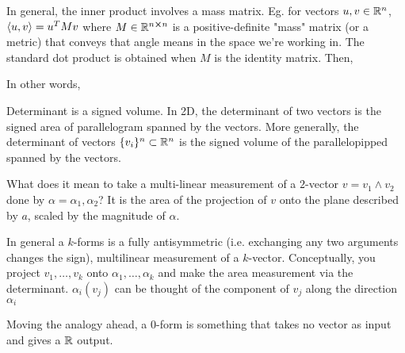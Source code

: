 In general, the inner product involves a mass matrix. Eg. for vectors $u,v \in \mathbb{R}^n$, $\langle u , v \rangle= u^T M v$ where $M\in \mathbb{R}^{n\cross n}$ is a positive-definite "mass" matrix (or a metric) that conveys that angle means in the space we're working in. The standard dot product is obtained when $M$ is the identity matrix. Then,

In other words,

\begin{definition}
    Determinant is a signed volume. In 2D, the determinant of two vectors is the signed area of parallelogram spanned by the vectors. More generally, the determinant of vectors $\{v_i\}^n\subset\mathbb{R}^n$ is the signed volume of the parallelopipped spanned by the vectors.
\end{definition}


\begin{definition}[$k$-forms]
    What does it mean to take a multi-linear measurement of a $2$-vector $v = v_1\wedge v_2$ done by $\alpha = \alpha_1,\alpha_2$? It is the area of the projection of $v$ onto the plane described by $a$, scaled by the magnitude of $\alpha$.
    
    
    In general a $k$-forms is a fully antisymmetric (i.e. exchanging any two arguments changes the sign), multilinear measurement of a $k$-vector. Conceptually, you project $v_1,\dotsc,v_k$ onto $\alpha_1,\dotsc,\alpha_k$ and make the area measurement via the determinant.
    $\alpha_i(v_j)$ can be thought of the component of $v_j$ along the direction $\alpha_i$
\end{definition}

Moving the analogy ahead, a $0$-form is something that takes no vector as input and gives a $\mathbb{R}$ output.

